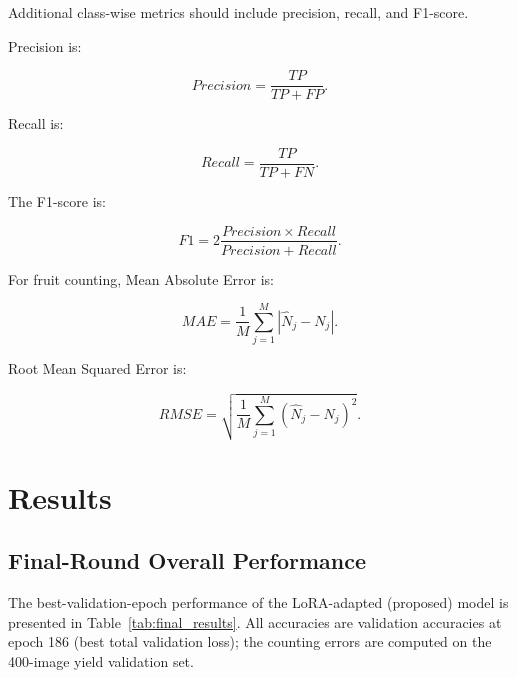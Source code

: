 \documentclass[preprint,12pt]{elsarticle}
\begin{document}
Additional class-wise metrics should include precision, recall, and
F1-score.

Precision is:

\begin{equation}
Precision=
\frac{TP}{TP+FP}.
\end{equation}

Recall is:

\begin{equation}
Recall=
\frac{TP}{TP+FN}.
\end{equation}

The F1-score is:

\begin{equation}
F1=
2
\frac{Precision\times Recall}
{Precision+Recall}.
\end{equation}

For fruit counting, Mean Absolute Error is:

\begin{equation}
MAE=
\frac{1}{M}
\sum_{j=1}^{M}
|\hat{N}_j-N_j|.
\end{equation}

Root Mean Squared Error is:

\begin{equation}
RMSE=
\sqrt{
\frac{1}{M}
\sum_{j=1}^{M}
(\hat{N}_j-N_j)^2
}.
\end{equation}


\section{Results}
\label{sec:results}


\subsection{Final-Round Overall Performance}

The best-validation-epoch performance of the LoRA-adapted (proposed)
model is presented in Table~\ref{tab:final_results}. All accuracies are
validation accuracies at epoch 186 (best total validation loss); the
counting errors are computed on the 400-image yield validation set.
\end{document}
